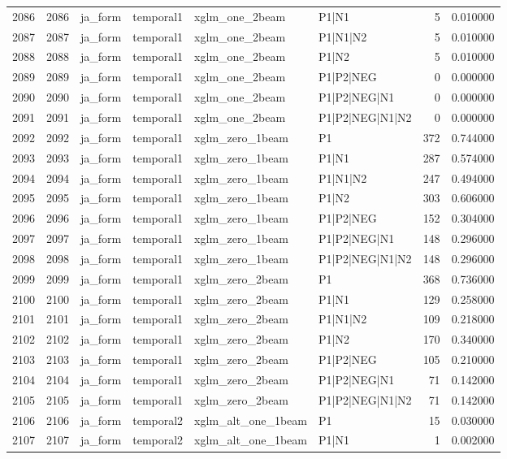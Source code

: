 \begin{tabular}{lrllllrr}
2086 & 2086 & ja_form & temporal1 & xglm_one_2beam & P1|N1 & 5 & 0.010000 \\
2087 & 2087 & ja_form & temporal1 & xglm_one_2beam & P1|N1|N2 & 5 & 0.010000 \\
2088 & 2088 & ja_form & temporal1 & xglm_one_2beam & P1|N2 & 5 & 0.010000 \\
2089 & 2089 & ja_form & temporal1 & xglm_one_2beam & P1|P2|NEG & 0 & 0.000000 \\
2090 & 2090 & ja_form & temporal1 & xglm_one_2beam & P1|P2|NEG|N1 & 0 & 0.000000 \\
2091 & 2091 & ja_form & temporal1 & xglm_one_2beam & P1|P2|NEG|N1|N2 & 0 & 0.000000 \\
2092 & 2092 & ja_form & temporal1 & xglm_zero_1beam & P1 & 372 & 0.744000 \\
2093 & 2093 & ja_form & temporal1 & xglm_zero_1beam & P1|N1 & 287 & 0.574000 \\
2094 & 2094 & ja_form & temporal1 & xglm_zero_1beam & P1|N1|N2 & 247 & 0.494000 \\
2095 & 2095 & ja_form & temporal1 & xglm_zero_1beam & P1|N2 & 303 & 0.606000 \\
2096 & 2096 & ja_form & temporal1 & xglm_zero_1beam & P1|P2|NEG & 152 & 0.304000 \\
2097 & 2097 & ja_form & temporal1 & xglm_zero_1beam & P1|P2|NEG|N1 & 148 & 0.296000 \\
2098 & 2098 & ja_form & temporal1 & xglm_zero_1beam & P1|P2|NEG|N1|N2 & 148 & 0.296000 \\
2099 & 2099 & ja_form & temporal1 & xglm_zero_2beam & P1 & 368 & 0.736000 \\
2100 & 2100 & ja_form & temporal1 & xglm_zero_2beam & P1|N1 & 129 & 0.258000 \\
2101 & 2101 & ja_form & temporal1 & xglm_zero_2beam & P1|N1|N2 & 109 & 0.218000 \\
2102 & 2102 & ja_form & temporal1 & xglm_zero_2beam & P1|N2 & 170 & 0.340000 \\
2103 & 2103 & ja_form & temporal1 & xglm_zero_2beam & P1|P2|NEG & 105 & 0.210000 \\
2104 & 2104 & ja_form & temporal1 & xglm_zero_2beam & P1|P2|NEG|N1 & 71 & 0.142000 \\
2105 & 2105 & ja_form & temporal1 & xglm_zero_2beam & P1|P2|NEG|N1|N2 & 71 & 0.142000 \\
2106 & 2106 & ja_form & temporal2 & xglm_alt_one_1beam & P1 & 15 & 0.030000 \\
2107 & 2107 & ja_form & temporal2 & xglm_alt_one_1beam & P1|N1 & 1 & 0.002000 \\

\end{tabular}
